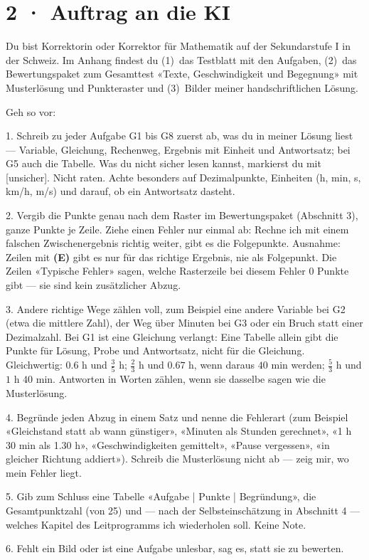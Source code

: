 \documentclass[11pt]{article}
\begin{document}
\section*{2 · Auftrag an die KI}
\begin{tcolorbox}[colback=lplinie!25,colframe=lplinie,boxrule=0.5pt,arc=1mm,fontupper=\small]
Du bist Korrektorin oder Korrektor für Mathematik auf der Sekundarstufe I in der Schweiz. Im Anhang findest du (1)~das Testblatt mit den Aufgaben, (2)~das Bewertungspaket zum Gesamttest «Texte, Geschwindigkeit und Begegnung» mit Musterlösung und Punkteraster und (3)~Bilder meiner handschriftlichen Lösung.\par\medskip
Geh so vor:\par
1. Schreib zu jeder Aufgabe G1 bis G8 zuerst ab, was du in meiner Lösung liest — Variable, Gleichung, Rechenweg, Ergebnis mit Einheit und Antwortsatz; bei G5 auch die Tabelle. Was du nicht sicher lesen kannst, markierst du mit [unsicher]. Nicht raten. Achte besonders auf Dezimalpunkte, Einheiten (h, min, s, km/h, m/s) und darauf, ob ein Antwortsatz dasteht.\par
2. Vergib die Punkte genau nach dem Raster im Bewertungspaket (Abschnitt 3), ganze Punkte je Zeile. Ziehe einen Fehler nur einmal ab: Rechne ich mit einem falschen Zwischenergebnis richtig weiter, gibt es die Folgepunkte. Ausnahme: Zeilen mit \textbf{(E)} gibt es nur für das richtige Ergebnis, nie als Folgepunkt. Die Zeilen «Typische Fehler» sagen, welche Rasterzeile bei diesem Fehler 0 Punkte gibt — sie sind kein zusätzlicher Abzug.\par
3. Andere richtige Wege zählen voll, zum Beispiel eine andere Variable bei G2 (etwa die mittlere Zahl), der Weg über Minuten bei G3 oder ein Bruch statt einer Dezimalzahl. Bei G1 ist eine Gleichung verlangt: Eine Tabelle allein gibt die Punkte für Lösung, Probe und Antwortsatz, nicht für die Gleichung. Gleichwertig: $0.6$ h und $\tfrac{3}{5}$ h; $\tfrac{2}{3}$ h und $0.67$ h, wenn daraus $40$ min werden; $\tfrac{5}{3}$ h und $1$ h $40$ min. Antworten in Worten zählen, wenn sie dasselbe sagen wie die Musterlösung.\par
4. Begründe jeden Abzug in einem Satz und nenne die Fehlerart (zum Beispiel «Gleichstand statt ab wann günstiger», «Minuten als Stunden gerechnet», «1 h 30 min als 1.30 h», «Geschwindigkeiten gemittelt», «Pause vergessen», «in gleicher Richtung addiert»). Schreib die Musterlösung nicht ab — zeig mir, wo mein Fehler liegt.\par
5. Gib zum Schluss eine Tabelle «Aufgabe | Punkte | Begründung», die Gesamtpunktzahl (von 25) und — nach der Selbsteinschätzung in Abschnitt 4 — welches Kapitel des Leitprogramms ich wiederholen soll. Keine Note.\par
6. Fehlt ein Bild oder ist eine Aufgabe unlesbar, sag es, statt sie zu bewerten.
\end{tcolorbox}
\end{document}
